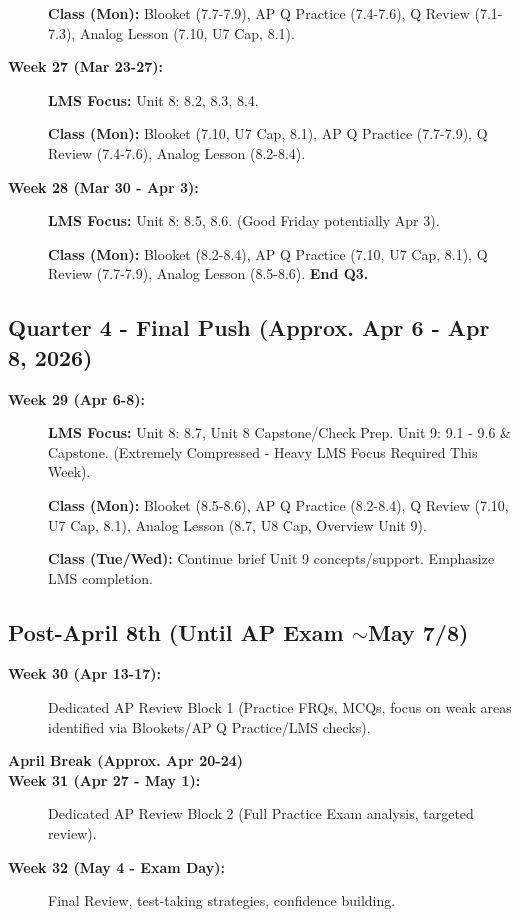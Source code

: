 \documentclass[11pt]{article}
\begin{document}
\begin{description}
  \textbf{Class (Mon):} Blooket (7.7-7.9), AP Q Practice (7.4-7.6), Q Review (7.1-7.3), Analog Lesson (7.10, U7 Cap, 8.1).
  
  \item[\textbf{Week 27 (Mar 23-27):}] \textbf{LMS Focus:} Unit 8: 8.2, 8.3, 8.4.
  
  \textbf{Class (Mon):} Blooket (7.10, U7 Cap, 8.1), AP Q Practice (7.7-7.9), Q Review (7.4-7.6), Analog Lesson (8.2-8.4).
  
  \item[\textbf{Week 28 (Mar 30 - Apr 3):}] \textbf{LMS Focus:} Unit 8: 8.5, 8.6. (Good Friday potentially Apr 3).
  
  \textbf{Class (Mon):} Blooket (8.2-8.4), AP Q Practice (7.10, U7 Cap, 8.1), Q Review (7.7-7.9), Analog Lesson (8.5-8.6). \textbf{End Q3.}
\end{description}

\subsection*{\textcolor{lynnmaroon}{Quarter 4 - Final Push (Approx. Apr 6 - Apr 8, 2026)}}

\begin{description}
  \item[\textbf{Week 29 (Apr 6-8):}] \textbf{LMS Focus:} Unit 8: 8.7, Unit 8 Capstone/Check Prep. Unit 9: 9.1 - 9.6 \& Capstone. (Extremely Compressed - Heavy LMS Focus Required This Week).
  
  \textbf{Class (Mon):} Blooket (8.5-8.6), AP Q Practice (8.2-8.4), Q Review (7.10, U7 Cap, 8.1), Analog Lesson (8.7, U8 Cap, Overview Unit 9).
  
  \textbf{Class (Tue/Wed):} Continue brief Unit 9 concepts/support. Emphasize LMS completion.
\end{description}   

\begin{center}
\fbox{\Large \textbf{\textcolor{lynnmaroon}{--- TARGET DATE REACHED: April 8th ---}}}
\end{center}

\subsection*{\textcolor{lynnmaroon}{Post-April 8th (Until AP Exam $\sim$May 7/8)}}

\begin{description}
  \item[\textbf{Week 30 (Apr 13-17):}] Dedicated AP Review Block 1 (Practice FRQs, MCQs, focus on weak areas identified via Blookets/AP Q Practice/LMS checks).
  
  \item[\textbf{April Break (Approx. Apr 20-24)}]
  
  \item[\textbf{Week 31 (Apr 27 - May 1):}] Dedicated AP Review Block 2 (Full Practice Exam analysis, targeted review).
  
  \item[\textbf{Week 32 (May 4 - Exam Day):}] Final Review, test-taking strategies, confidence building.
\end{description}
\end{document}
